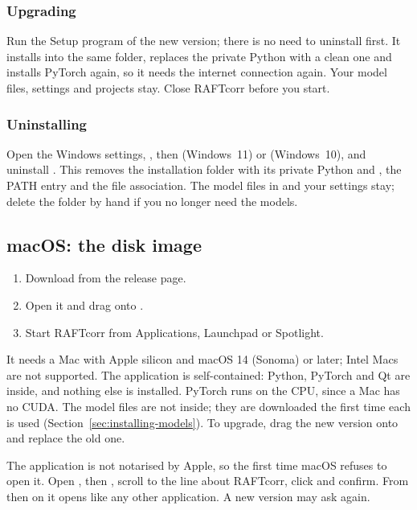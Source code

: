 \subsubsection*{Upgrading}
Run the Setup program of the new version; there is no need to uninstall first. It installs into
the same folder, replaces the private Python with a clean one and installs PyTorch again, so it
needs the internet connection again. Your model files, settings and projects stay. Close RAFTcorr
before you start.

\subsubsection*{Uninstalling}
Open the Windows settings, , then  (Windows~11) or
 (Windows~10), and uninstall . This removes the installation
folder with its private Python and , the PATH entry and the 
file association. The model files in
 and your settings stay;
delete the folder by hand if you no longer need the models.

\subsection{macOS: the disk image}
\label{sec:installing-macos}

\begin{enumerate}
  \item Download  from the release page.
  \item Open it and drag  onto .
  \item Start RAFTcorr from Applications, Launchpad or Spotlight.
\end{enumerate}

It needs a Mac with Apple silicon and macOS 14 (Sonoma) or later; Intel Macs are not supported.
The application is self-contained: Python, PyTorch and Qt are inside, and nothing else is
installed. PyTorch runs on the CPU, since a Mac has no CUDA. The model files are not inside; they
are downloaded the first time each is used (Section~\ref{sec:installing-models}). To upgrade,
drag the new version onto  and replace the old one.

\begin{notebox}
The application is not notarised by Apple, so the first time macOS refuses to open it. Open
, then , scroll to the line about RAFTcorr, click
 and confirm. From then on it opens like any other application. A new version may
ask again.
\end{notebox}

